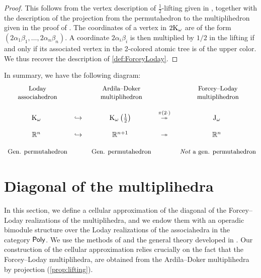 \documentclass[10pt]{amsart}
\theoremstyle{remark}
\begin{document}
\begin{proof} 
  This follows from the vertex description of $\tfrac{1}{2}$-lifting given in \cite[Definition 3.5.3]{Doker11}, together with the description of the projection from the permutahedron to the multiplihedron given in the proof of \cite[Theorem 3.3.6]{Doker11}. 
  The coordinates of a vertex in $2 \mathrm{K}_\omega$ are of the form $(2\alpha_1\beta_1, \ldots, 2\alpha_n\beta_n)$. 
  A coordinate $2\alpha_i\beta_i$ is then multiplied by $1/2$ in the lifting if and only if its associated vertex in the 2-colored atomic tree is of the upper color. 
  We thus recover the description of \cref{def:ForceyLoday}.
\end{proof}

In summary, we have the following diagram:
\medskip
\begin{equation*}
\begin{matrix}
  $ \small  \text{Loday}$ & & $ \small \text{Ardila--Doker}$ &  & $ \small \text{Forcey--Loday}$ \\
  $ \small  \text{associahedron}$ & & $ \small \text{multiplihedron}$ &  & $ \small \text{multiplihedron}$ \\
  & &  &  & \\
  \K_\omega & \hookrightarrow & \K_\omega \left(\tfrac{1}{2}\right) & \overset{\pi ( 2 \cdot ) }{\twoheadrightarrow} & \J_\omega \\
   & &  &  & \\
  \RR^n & \hookrightarrow & \RR^{n+1} & \twoheadrightarrow & \RR^n \\
  & &  &  & \\
  $ \small \text{Gen. permutahedron}$ & & $ \small \text{Gen. permutahedron}$ &  & $ \small \textit{Not}\text{ a gen. permutahedron}$
\end{matrix}
\end{equation*}


\section{Diagonal of the multiplihedra}
\label{sec:II}

In this section, we define a cellular approximation of the diagonal of the Forcey--Loday realizations of the multiplihedra, and we endow them with an operadic bimodule structure over the Loday realizations of the associahedra in the category $\mathsf{Poly}$. 
We use the methods of \cite{MTTV19} and the general theory developed in \cite{LA21}.
Our construction of the cellular approximation relies crucially on the fact that the Forcey--Loday multiplihedra, are obtained from the Ardila--Doker multiplihedra by projection (\cref{prop:lifting}).
\end{document}
